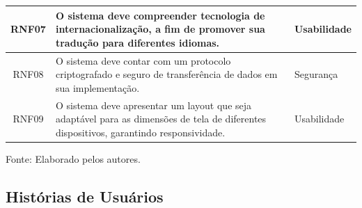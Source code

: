 \documentclass[
    12pt,               %
    openright,          %
    oneside,
    a4paper,            %
    BIBLATEX,           %
    TODO,               %
    english,            %
    brazil              %
    ]{ifsp-spo-inf-ctds}
\begin{document}
\begin{center}
\begin{quadro}[h]
\begin{tabulary}{1.0\textwidth}{|C|p{25em}|p{7em}|}
                \hline
                RNF07 & O sistema deve compreender tecnologia de internacionalização, a fim de promover sua tradução para diferentes idiomas. & Usabilidade\\
                \hline
                RNF08 & O sistema deve contar com um protocolo criptografado e seguro de transferência de dados em sua implementação. & Segurança\\
                \hline
                RNF09 & O sistema deve apresentar um layout que seja adaptável para as dimensões de tela de diferentes dispositivos, garantindo responsividade. & Usabilidade\\
                \hline
                \end{tabulary}
                \label{tab:req_nfunc}
                \centering
                
               \footnotesize Fonte: Elaborado pelos autores.
                \end{quadro}
            \end{center}

\subsection{Histórias de Usuários}
\end{document}
